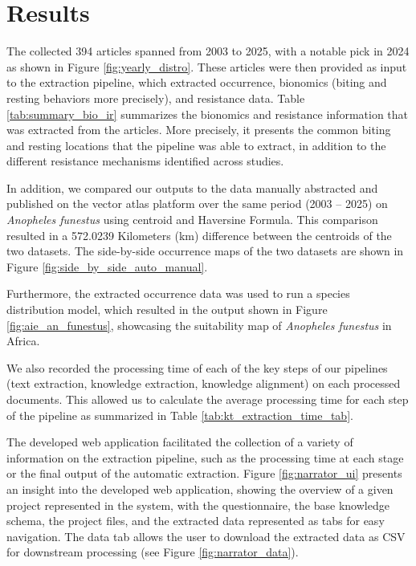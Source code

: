 \documentclass{article}
\begin{document}
\section{Results}
\label{sec:results}
\par 
The collected 394 articles spanned from 2003 to 2025, with a notable pick in 2024 as shown in Figure \ref{fig:yearly_distro}. 
These articles were then provided as input to the extraction pipeline, which extracted occurrence, bionomics (biting and resting behaviors more precisely), and resistance data.  
Table \ref{tab:summary_bio_ir} summarizes the bionomics and resistance information that was extracted from the articles. 
More precisely, it presents the common biting and resting locations that the pipeline was able to extract, in addition to the different resistance mechanisms identified across studies.
\par 
In addition, we compared our outputs to the data manually abstracted and published on the vector atlas platform over the same period (2003 – 2025) on \textit{Anopheles funestus} using centroid and Haversine Formula. 
This comparison resulted in a 572.0239 Kilometers (km) difference between the centroids of the two datasets. 
The side-by-side occurrence maps of the two datasets are shown in Figure \ref{fig:side_by_side_auto_manual}.
\par
Furthermore, the extracted occurrence data was used to run a species distribution model, which resulted in the output shown in Figure \ref{fig:aie_an_funestus}, 
showcasing the suitability map of \textit{Anopheles funestus} in Africa.
\par
We also recorded the processing time of each of the key steps of our pipelines (text extraction, knowledge extraction, knowledge alignment) on each processed documents. 
This allowed us to calculate the average processing time for each step of the pipeline as summarized in Table \ref{tab:kt_extraction_time_tab}.

\par
The developed web application facilitated the collection of a variety of information on the extraction pipeline, such as the processing time at each stage or the final output of the automatic extraction. 
Figure \ref{fig:narrator_ui} presents an insight into the developed web application, showing the overview of a given project represented in the system, with the questionnaire, the base knowledge schema, the project files, and the extracted data represented as tabs for easy navigation. The data tab allows the user to download the extracted data as CSV for downstream processing (see Figure \ref{fig:narrator_data}).
\end{document}
